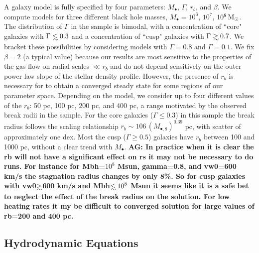 \documentclass[usenatbib,fleqn]{mn2e}
\newcommand\lsim{\mathrel{\rlap{\lower4pt\hbox{\hskip1pt$\sim$}}
    \raise1pt\hbox{$<$}}}
\newcommand\gsim{\mathrel{\rlap{\lower4pt\hbox{\hskip1pt$\sim$}}
    \raise1pt\hbox{$>$}}}
\newcommand{\rb}{r_b}
\newcommand{\Mbh}[1][]{M_{\bullet#1}}
\newcommand{\Mbheight}{M_{\bullet,8}}
\begin{document}
A galaxy model is fully specified by four parameters: $\Mbh$,
$\Gamma$, $r_b$, and $\beta$.  We compute models for three different
black hole masses, $\Mbh = 10^6$, $10^7$, $10^8 \,{\rm M_\odot}$.  The
distribution of $\Gamma$ in the \citet{LauerFaber+:2007a} sample is
bimodal, with a concentration of ``core" galaxies with $\Gamma \lsim
0.3$ and a concentration of ``cusp" galaxies with $\Gamma \gsim 0.7$.
We bracket these possibilities by considering models with $\Gamma=0.8$
and $\Gamma=0.1$.  We fix $\beta = 2$ (a typical value) because our results are most sensitive to the
properties of the gas flow on radial scales $\ll r_b$ and do not depend sensitively on the outer power law slope of the stellar density profile. However, the presence of $\rb$ is necessary for to obtain a converged steady state for some regions of our parameter space.  Depending on the model, we
consider up to four different values of the $\rb$: 50 pc, 100 pc, 200 pc,
and 400 pc, a range motivated by the observed break radii in
the \citet{LauerFaber+:2007a} sample. For the core galaxies ($\Gamma \le$0.3) in this sample the break radius follows the scaling relationship $\rb\sim 106 \, (\Mbheight)^{0.39}$ pc, with scatter of
approximately one dex. Most the cusp ($\Gamma \ge0.5$) galaxies have
$\rb$ between 100 and 1000 pc, without a clear trend with $\Mbh$. {\bf AG: In practice when it is clear the rb will not have a
  significant effect on rs it may not be necessary to do runs. For
  instance for Mbh=$10^8$ Msun, gamma=0.8, and vw0=600 km/s the
  stagnation radius changes by only 8\%. So for cusp galaxies with
  vw0$\gsim$600 km/s and Mbh$\lsim 10^8$ Msun it seems like it is a
  safe bet to neglect the effect of the break radius on the
  solution. For low heating rates it my be difficult to converged
  solution for large values of rb=200 and 400 pc.}

\subsection{Hydrodynamic Equations}
\label{sec:hydro}
\end{document}
